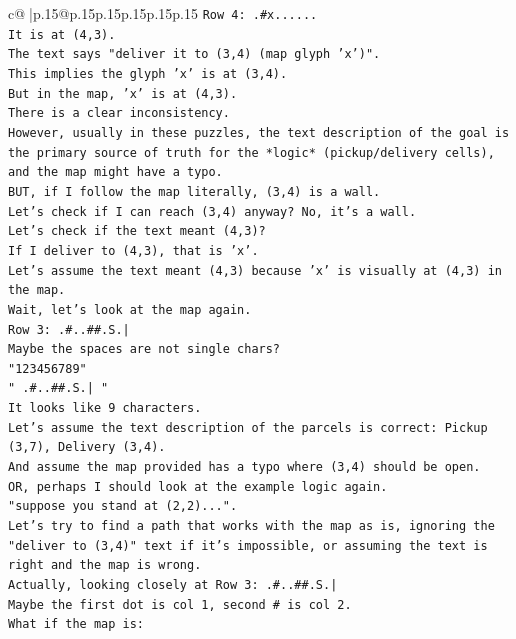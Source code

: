 \documentclass{article}
\begin{document}
{\begin{supertabular}{c@{$\;$}|p{.15\linewidth}@{}p{.15\linewidth}p{.15\linewidth}p{.15\linewidth}p{.15\linewidth}p{.15\linewidth}}
{{{\texttt{Row 4: .\#x......} \\
\texttt{It is at (4,3).} \\
\texttt{The text says "deliver it to (3,4) (map glyph 'x')".} \\
\texttt{This implies the glyph 'x' is at (3,4).} \\
\texttt{But in the map, 'x' is at (4,3).} \\
\texttt{There is a clear inconsistency.} \\
\texttt{However, usually in these puzzles, the text description of the goal is the primary source of truth for the *logic* (pickup/delivery cells), and the map might have a typo.} \\
\texttt{BUT, if I follow the map literally, (3,4) is a wall.} \\
\texttt{Let's check if I can reach (3,4) anyway? No, it's a wall.} \\
\texttt{Let's check if the text meant (4,3)?} \\
\texttt{If I deliver to (4,3), that is 'x'.} \\
\texttt{Let's assume the text meant (4,3) because 'x' is visually at (4,3) in the map.} \\
\texttt{Wait, let's look at the map again.} \\
\texttt{Row 3: .\#..\#\#.S.|} \\
\texttt{Maybe the spaces are not single chars?} \\
\texttt{"123456789"} \\
\texttt{" .\#..\#\#.S.| "} \\
\texttt{It looks like 9 characters.} \\
\texttt{Let's assume the text description of the parcels is correct: Pickup (3,7), Delivery (3,4).} \\
\texttt{And assume the map provided has a typo where (3,4) should be open.} \\
\texttt{OR, perhaps I should look at the example logic again.} \\
\texttt{"suppose you stand at (2,2)...".} \\
\texttt{Let's try to find a path that works with the map as is, ignoring the "deliver to (3,4)" text if it's impossible, or assuming the text is right and the map is wrong.} \\
\texttt{Actually, looking closely at Row 3: .\#..\#\#.S.|} \\
\texttt{Maybe the first dot is col 1, second \# is col 2.} \\
\texttt{What if the map is:} \\
}}}
\end{supertabular}}
\end{document}
